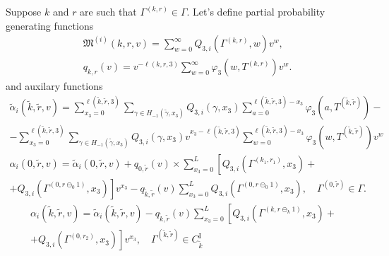 \documentclass[runningheads,a4paper]{llncs}
\begin{document}
Suppose $k$ and $r$ are such that $\Gamma^{(k,r)}\in \Gamma$. Let's define  partial probability generating functions 
\begin{align*}
&\mathfrak{M}^{(i)}(k,r,v) = \sum_{w=0}^{\infty} Q_{3,i}(\Gamma^{(k,r)},w) v^w,\\
&q_{k,r}(v) = v^{-\ell(k,r,3)}\sum_{w=0}^{\infty} \varphi_3(w,T^{(k,r)})v^w.
\end{align*}
and auxilary functions
\begin{multline*}
\tilde{\alpha}_i(\tilde{k},\tilde{r},v) = \sum_{x_3=0}^{\ell(\tilde{k},\tilde{r},3)}\sum_{\gamma \in H_{-1}(\tilde{\gamma},x_3)} Q_{3,i}(\gamma,x_3) \sum_{a=0}^{\ell(\tilde{k},\tilde{r},3) - x_3} \varphi_3(a,T^{(\tilde{k},\tilde{r})}) - \\
- \sum_{x_3=0}^{\ell(\tilde{k},\tilde{r},3)}  \sum_{\gamma \in H_{-1}(\tilde{\gamma},x_3)} Q_{3,i}(\gamma,x_3) v^{x_3-\ell(\tilde{k},\tilde{r},3)}  \sum_{w=0}^{\ell(\tilde{k},\tilde{r},3) -x_3}
\varphi_3(w,T^{(\tilde{k},\tilde{r})}) v^w
\end{multline*}
\begin{multline*}
\alpha_i(0,\tilde{r},v) =\tilde{\alpha}_i(0,\tilde{r},v) + q_{0,\tilde{r}}(v) \times \sum_{x_3=0}^{L} \left[ Q_{3,i}(\Gamma^{(k_1,r_1)},x_3) +\right. \\
\left. + Q_{3,i}(\Gamma^{(0,r\ominus_0 1)},x_3) \right] v^{x_3}  -  q_{\tilde{k},\tilde{r}}(v)\sum_{x_3=0}^{L} Q_{3,i}(\Gamma^{(0,r\ominus_0 1)},x_3), \quad \Gamma^{(0,\tilde{r})} \in \Gamma.
\end{multline*}
\begin{multline*}
\alpha_i(\tilde{k},\tilde{r},v) =\tilde{\alpha}_i(\tilde{k},\tilde{r},v) - q_{\tilde{k},\tilde{r}}(v)\sum_{x_3=0}^{L} \left[ Q_{3,i}(\Gamma^{(k,r\ominus_k 1)},x_3) + \right. \\ \left.+ Q_{3,i}(\Gamma^{(0,r_2)},x_3) \right] v^{x_3}, \quad \Gamma^{(\tilde{k}, \tilde{r})} \in C_{\tilde{k}}^{\mathrm{I}}
\end{multline*}
\end{document}
